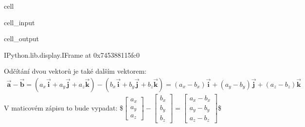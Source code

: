 \documentclass[letterpaper,10pt,english]{jupyterBook}
\begin{document}
\begin{sphinxuseclass}{cell}\begin{sphinxVerbatimInput}

\begin{sphinxuseclass}{cell_input}
\begin{sphinxVerbatim}[commandchars=\\\{\}]
  
\end{sphinxVerbatim}

\end{sphinxuseclass}\end{sphinxVerbatimInput}
\begin{sphinxVerbatimOutput}

\begin{sphinxuseclass}{cell_output}
\begin{sphinxVerbatim}[commandchars=\\\{\}]
\PYGZlt{}IPython.lib.display.IFrame at 0x745388115fc0\PYGZgt{}
\end{sphinxVerbatim}

\end{sphinxuseclass}\end{sphinxVerbatimOutput}

\end{sphinxuseclass}
\sphinxAtStartPar
Odčítání dvou vektorů je také dalším vektorem:
\begin{equation*}
\begin{split} \overrightarrow{\mathbf{a}} - \overrightarrow{\mathbf{b}} = (a_x\vec{\mathbf{i}} + a_y\vec{\mathbf{j}} + a_z\vec{\mathbf{k}}) - (b_x\vec{\mathbf{i}} + b_y\vec{\mathbf{j}} + b_z\vec{\mathbf{k}}) = 
(a_x-b_x)\vec{\mathbf{i}} + (a_y-b_y)\vec{\mathbf{j}} + (a_z-b_z)\vec{\mathbf{k}} \end{split}
\end{equation*}
\sphinxAtStartPar
V maticovém zápisu to bude vypadat:
\$\(\begin{bmatrix} a_x \\ a_y \\ a_z \end{bmatrix}  -  \begin{bmatrix} b_x \\ b_y \\ b_z \end{bmatrix} = \begin{bmatrix} a_x - b_x \\ a_y - b_y \\ a_z - b_z \end{bmatrix}\)\$
\end{document}
